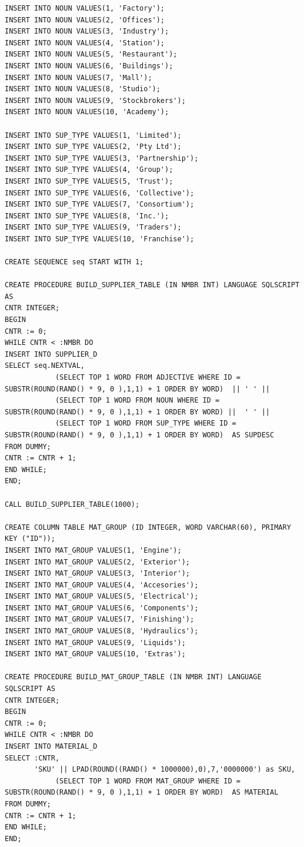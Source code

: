 \begin{lstlisting}
INSERT INTO NOUN VALUES(1, 'Factory');
INSERT INTO NOUN VALUES(2, 'Offices');
INSERT INTO NOUN VALUES(3, 'Industry');
INSERT INTO NOUN VALUES(4, 'Station');
INSERT INTO NOUN VALUES(5, 'Restaurant');
INSERT INTO NOUN VALUES(6, 'Buildings');
INSERT INTO NOUN VALUES(7, 'Mall');
INSERT INTO NOUN VALUES(8, 'Studio');
INSERT INTO NOUN VALUES(9, 'Stockbrokers');
INSERT INTO NOUN VALUES(10, 'Academy');
 
INSERT INTO SUP_TYPE VALUES(1, 'Limited');
INSERT INTO SUP_TYPE VALUES(2, 'Pty Ltd');
INSERT INTO SUP_TYPE VALUES(3, 'Partnership');
INSERT INTO SUP_TYPE VALUES(4, 'Group');
INSERT INTO SUP_TYPE VALUES(5, 'Trust');
INSERT INTO SUP_TYPE VALUES(6, 'Collective');
INSERT INTO SUP_TYPE VALUES(7, 'Consortium');
INSERT INTO SUP_TYPE VALUES(8, 'Inc.');
INSERT INTO SUP_TYPE VALUES(9, 'Traders');
INSERT INTO SUP_TYPE VALUES(10, 'Franchise');
 
CREATE SEQUENCE seq START WITH 1;
 
CREATE PROCEDURE BUILD_SUPPLIER_TABLE (IN NMBR INT) LANGUAGE SQLSCRIPT AS
CNTR INTEGER;
BEGIN
CNTR := 0;
WHILE CNTR < :NMBR DO
INSERT INTO SUPPLIER_D
SELECT seq.NEXTVAL,
            (SELECT TOP 1 WORD FROM ADJECTIVE WHERE ID = SUBSTR(ROUND(RAND() * 9, 0 ),1,1) + 1 ORDER BY WORD)  || ' ' ||
            (SELECT TOP 1 WORD FROM NOUN WHERE ID = SUBSTR(ROUND(RAND() * 9, 0 ),1,1) + 1 ORDER BY WORD) ||  ' ' ||
            (SELECT TOP 1 WORD FROM SUP_TYPE WHERE ID = SUBSTR(ROUND(RAND() * 9, 0 ),1,1) + 1 ORDER BY WORD)  AS SUPDESC
FROM DUMMY;      
CNTR := CNTR + 1;
END WHILE;
END;
 
CALL BUILD_SUPPLIER_TABLE(1000);
 
CREATE COLUMN TABLE MAT_GROUP (ID INTEGER, WORD VARCHAR(60), PRIMARY KEY ("ID"));
INSERT INTO MAT_GROUP VALUES(1, 'Engine');
INSERT INTO MAT_GROUP VALUES(2, 'Exterior');
INSERT INTO MAT_GROUP VALUES(3, 'Interior');
INSERT INTO MAT_GROUP VALUES(4, 'Accesories');
INSERT INTO MAT_GROUP VALUES(5, 'Electrical');
INSERT INTO MAT_GROUP VALUES(6, 'Components');
INSERT INTO MAT_GROUP VALUES(7, 'Finishing');
INSERT INTO MAT_GROUP VALUES(8, 'Hydraulics');
INSERT INTO MAT_GROUP VALUES(9, 'Liquids');
INSERT INTO MAT_GROUP VALUES(10, 'Extras');
 
CREATE PROCEDURE BUILD_MAT_GROUP_TABLE (IN NMBR INT) LANGUAGE SQLSCRIPT AS
CNTR INTEGER;
BEGIN
CNTR := 0;
WHILE CNTR < :NMBR DO
INSERT INTO MATERIAL_D
SELECT :CNTR,
       'SKU' || LPAD(ROUND((RAND() * 1000000),0),7,'0000000') as SKU,
            (SELECT TOP 1 WORD FROM MAT_GROUP WHERE ID = SUBSTR(ROUND(RAND() * 9, 0 ),1,1) + 1 ORDER BY WORD)  AS MATERIAL
FROM DUMMY;      
CNTR := CNTR + 1;
END WHILE;
END;
 

\end{lstlisting}
